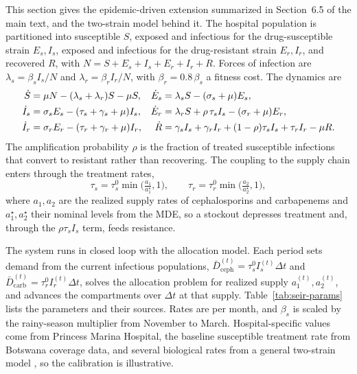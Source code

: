 \documentclass[11pt]{article}
\begin{document}
This section gives the epidemic-driven extension summarized in Section~6.5 of the main text, and the two-strain model behind it.
The hospital population is partitioned into susceptible $S$, exposed and infectious for the drug-susceptible strain $E_s,I_s$, exposed and infectious for the drug-resistant strain $E_r,I_r$, and recovered $R$, with $N=S+E_s+I_s+E_r+I_r+R$.
Forces of infection are $\lambda_s = \beta_s I_s/N$ and $\lambda_r = \beta_r I_r/N$, with $\beta_r = 0.8\,\beta_s$ a fitness cost.
The dynamics are
\begin{align}
\dot S &= \mu N - (\lambda_s+\lambda_r)S - \mu S, &
\dot E_s &= \lambda_s S - (\sigma_s+\mu)E_s, \notag\\
\dot I_s &= \sigma_s E_s - (\tau_s+\gamma_s+\mu)I_s, &
\dot E_r &= \lambda_r S + \rho\,\tau_s I_s - (\sigma_r+\mu)E_r, \notag\\
\dot I_r &= \sigma_r E_r - (\tau_r+\gamma_r+\mu)I_r, &
\dot R &= \gamma_s I_s + \gamma_r I_r + (1-\rho)\tau_s I_s + \tau_r I_r - \mu R.
\end{align}
The amplification probability $\rho$ is the fraction of treated susceptible infections that convert to resistant rather than recovering.
The coupling to the supply chain enters through the treatment rates,
\begin{equation}
\tau_s = \tau_s^{0}\min\!\Big(\tfrac{a_1}{a_1^{\star}},1\Big), \qquad
\tau_r = \tau_r^{0}\min\!\Big(\tfrac{a_2}{a_2^{\star}},1\Big),
\end{equation}
where $a_1,a_2$ are the realized supply rates of cephalosporins and carbapenems and $a_1^{\star},a_2^{\star}$ their nominal levels from the MDE, so a stockout depresses treatment and, through the $\rho\tau_s I_s$ term, feeds resistance.

The system runs in closed loop with the allocation model.
Each period sets demand from the current infectious populations, $\bar D^{(t)}_{\text{ceph}} = \tau_s^{0} I_s^{(t)}\Delta t$ and $\bar D^{(t)}_{\text{carb}} = \tau_r^{0} I_r^{(t)}\Delta t$, solves the allocation problem for realized supply $a_1^{(t)}, a_2^{(t)}$, and advances the compartments over $\Delta t$ at that supply.
Table~\ref{tab:seir-params} lists the parameters and their sources.
Rates are per month, and $\beta_s$ is scaled by the rainy-season multiplier from November to March.
Hospital-specific values come from Princess Marina Hospital, the baseline susceptible treatment rate from Botswana coverage data, and several biological rates from a general two-strain model \citep{kd20}, so the calibration is illustrative.
\end{document}
